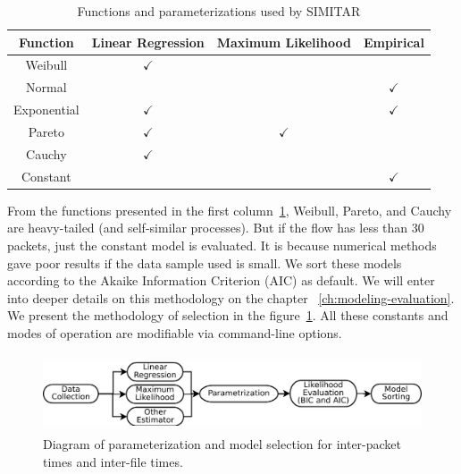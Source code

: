 \begin{table}[ht!]
	\centering
	\caption{Functions and parameterizations used by SIMITAR}
		\begin{tabular}{c c c c}
			\toprule
			\textbf{Function} & Linear Regression & Maximum Likelihood & Empirical\footnotemark \\
			\midrule
			Weibull         & $\checkmark$    &                  &                  \\
			Normal             &                  &                  &  $\checkmark$    \\
			Exponential      & $\checkmark$    &                  &  $\checkmark$    \\
			Pareto          & $\checkmark$    & $\checkmark$    &                  \\
			Cauchy          & $\checkmark$    &                  &                  \\
			Constant          &                 &                  & $\checkmark$    \\
			\bottomrule
		\end{tabular}
		\label{tab:parameterizations-sumary}
\end{table}


From the functions presented in the first column~\ref{tab:parameterizations-sumary}, Weibull, Pareto, and Cauchy are heavy-tailed (and self-similar processes). But if the flow has less than 30 packets, just the constant model is evaluated. It is because numerical methods gave poor results if the data sample used is small. We sort these models according to the Akaike Information Criterion (AIC) as default\cite{sourcesonoff-paper}\cite{bic-aic-comparision}. We will enter into deeper details on this methodology on the chapter ~\ref{ch:modeling-evaluation}. We present the methodology of selection in the figure~\ref{fig:model-parameterization}. All these constants and modes of operation are modifiable via command-line options.


\begin{figure}[ht!]
    \centering
    \includegraphics[height=0.9in]{figures/ch3/simitar-parametrization}
    \caption{Diagram of parameterization and model selection for inter-packet times and inter-file times.}
    \label{fig:model-parameterization}
\end{figure}


